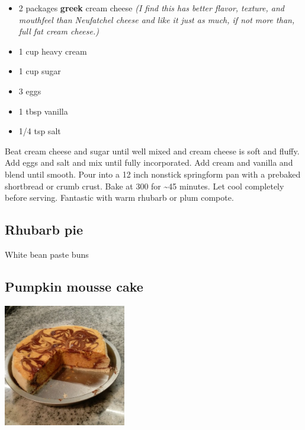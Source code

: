 \documentclass[
]{book}
\providecommand{\tightlist}{%
  \setlength{\itemsep}{0pt}\setlength{\parskip}{0pt}}
\begin{document}
\begin{blackbox}

\begin{itemize}
\tightlist
\item
  2 packages \textbf{greek} cream cheese \emph{(I find this has better flavor, texture, and mouthfeel than Neufatchel cheese and like it just as much, if not more than, full fat cream cheese.)}
\item
  1 cup heavy cream
\item
  1 cup sugar
\item
  3 eggs
\item
  1 tbsp vanilla
\item
  1/4 tsp salt
\end{itemize}

\end{blackbox}

Beat cream cheese and sugar until well mixed and cream cheese is soft and fluffy. Add eggs and salt and mix until fully incorporated. Add cream and vanilla and blend until smooth. Pour into a 12 inch nonstick springform pan with a prebaked shortbread or crumb crust. Bake at 300 for \textasciitilde45 minutes. Let cool completely before serving. Fantastic with warm rhubarb or plum compote.

\hypertarget{rhubarb-pie}{%
\subsection*{Rhubarb pie}\label{rhubarb-pie}}

White bean paste buns

\hypertarget{pumpkincake}{%
\subsection*{Pumpkin mousse cake}\label{pumpkincake}}

\includegraphics[width=0.4\textwidth,height=\textheight]{pumpkin_mousse_cake_small.jpg}
\end{document}
